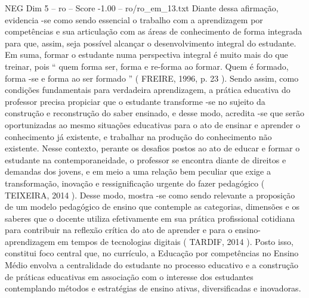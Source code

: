 \begin{textsample}{NEG Dim 5 – ro – Score -1.00 – ro/ro\_em\_13.txt}
Diante dessa afirmação, evidencia -se como sendo essencial o trabalho com a aprendizagem por competências e sua articulação com as áreas de conhecimento de forma integrada para que, assim, seja possível alcançar o desenvolvimento integral do estudante.
Em suma, formar o estudante numa perspectiva integral é muito mais do que treinar, pois “ quem forma ser, forma e re-forma ao formar.
Quem é formado, forma -se e forma ao ser formado ” ( FREIRE, 1996, p. 23 ).
Sendo assim, como condições fundamentais para verdadeira aprendizagem, a prática educativa do professor precisa propiciar que o estudante transforme -se no sujeito da construção e reconstrução do saber ensinado, e desse modo, acredita -se que serão oportunizadas ao mesmo situações educativas para o ato de ensinar e aprender o conhecimento já existente, e trabalhar na produção do conhecimento não existente.
Nesse contexto, perante os desafios postos ao ato de educar e formar o estudante na contemporaneidade, o professor se encontra diante de direitos e demandas dos jovens, e em meio a uma relação bem peculiar que exige a transformação, inovação e ressignificação urgente do fazer pedagógico ( TEIXEIRA, 2014 ).
Desse modo, mostra -se como sendo relevante a proposição de um modelo pedagógico de ensino que contemple as categorias, dimensões e os saberes que o docente utiliza efetivamente em sua prática profissional cotidiana para contribuir na reflexão crítica do ato de aprender e para o ensino-aprendizagem em tempos de tecnologias digitais ( TARDIF, 2014 ).
Posto isso, constitui foco central que, no currículo, a Educação por competências no Ensino Médio envolva a centralidade do estudante no processo educativo e a construção de práticas educativas em associação com o interesse dos estudantes contemplando métodos e estratégias de ensino ativas, diversificadas e inovadoras.

\end{textsample}
